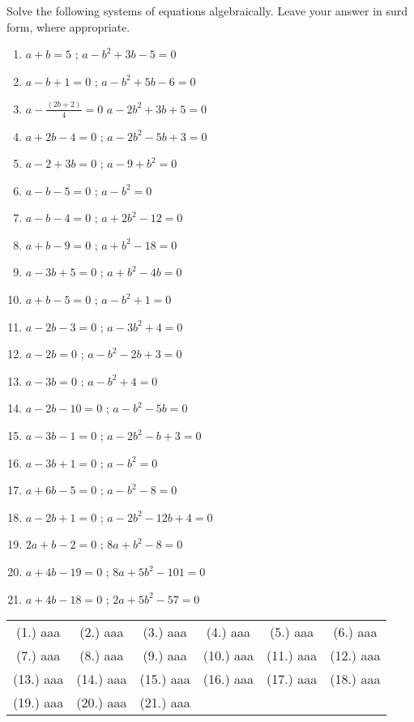\begin{eocexercises}{}
Solve the following systems of equations algebraically. Leave your answer in
surd form, where appropriate.

\begin{enumerate}[label=\textbf{\arabic*}.]
\item $a + b = 5$ ; $a-b^2 + 3b - 5 = 0$
\item $a - b + 1=0$ ; $a-b^2 + 5b - 6 =0$
\item $a-\frac{(2b + 2)}{4} = 0$  $a-2b^2 + 3b + 5 = 0$
\item $a+2b -4 = 0$ ; $a-2b^2 - 5b + 3 = 0$
\item $a-2+3b=0$ ; $a-9+b^2=0$
\item $a-b-5=0$ ; $a-b^2=0$
\item $a-b-4=0$ ; $a+2b^2-12=0$
\item $a+b-9=0$ ; $a+b^2-18=0$
\item $a-3b+5=0$ ; $a+b^2-4b=0$
\item $a+b-5=0 $ ; $a-b^2+1=0$
\item $a-2b-3=0 $ ; $a-3b^2+4=0$
\item $a-2b=0 $ ; $a-b^2-2b+3=0$
\item $a-3b=0$ ; $a-b^2+4=0$
\item $a-2b-10=0$ ; $a-b^2-5b=0$
\item $a-3b-1=0$ ; $a-2b^2-b+3=0$
\item $a-3b+1=0$ ; $a-b^2=0$
\item $a+6b-5=0$ ; $a-b^2-8=0$
\item $a-2b+1=0$ ; $a-2b^2-12b+4=0$
\item $2a+b-2=0$ ; $8a+b^2-8=0$
\item $a+4b-19=0$ ; $8a+5b^2-101=0$
\item $a+4b-18=0$ ; $2a+5b^2-57=0$
\end{enumerate}


\par \practiceinfo
\par \begin{tabular}[h]{cccccc}
(1.)	aaa	&
(2.)	aaa	&
(3.)	aaa	&
(4.)	aaa	&
(5.)	aaa	&
(6.)	aaa	\\ %
(7.)	aaa	&
(8.)	aaa	&
(9.)	aaa	&
(10.)	aaa	&
(11.)	aaa	&
(12.)	aaa	\\ %
(13.)	aaa	&
(14.)	aaa	&
(15.)	aaa	&
(16.)	aaa	&
(17.)	aaa	&
(18.)	aaa	\\ %
(19.)	aaa	&
(20.)	aaa	&
(21.)	aaa	&

\end{tabular}
\end{eocexercises}




